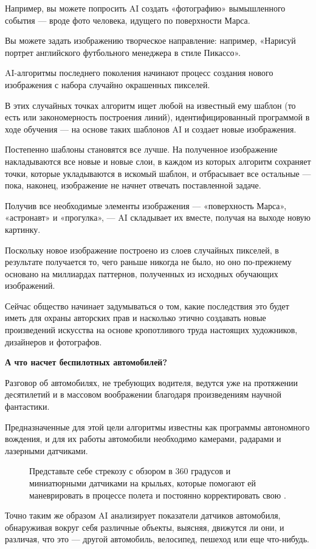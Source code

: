 Например, вы можете попросить AI создать «фотографию» вымышленного события — вроде фото человека, идущего по поверхности Марса.

Вы можете задать изображению творческое направление: например, «Нарисуй портрет английского футбольного менеджера в стиле Пикассо».

AI-алгоритмы последнего поколения начинают процесс создания нового изображения с набора случайно окрашенных пикселей.

В этих случайных точках алгоритм ищет любой  на известный ему шаблон (то есть  или закономерность построения линий), идентифицированный программой в ходе обучения --- на основе таких шаблонов AI и создает новые изображения.

Постепенно шаблоны становятся все лучше. На полученное изображение накладываются все новые и новые слои, в каждом из которых алгоритм сохраняет точки, которые укладываются в искомый шаблон, и отбрасывает все остальные — пока, наконец, изображение не начнет отвечать поставленной задаче.

Получив все необходимые элементы изображения — «поверхность Марса», «астронавт» и «прогулка», — AI складывает их вместе, получая на выходе новую картинку.

Поскольку новое изображение построено из слоев случайных пикселей, в результате получается то, чего раньше никогда не было, но оно по-прежнему основано на миллиардах паттернов, полученных из исходных обучающих изображений.

Сейчас общество начинает задумываться о том, какие последствия это будет иметь для охраны авторских прав и насколько этично создавать новые произведений искусства на основе кропотливого труда настоящих художников, дизайнеров и фотографов.


\textbf{А что насчет беспилотных автомобилей?}

Разговор об автомобилях, не требующих водителя, ведутся уже на протяжении десятилетий и   в массовом воображении благодаря произведениям научной фантастики.

Предназначенные для этой цели алгоритмы известны как программы автономного вождения, и для их работы автомобили необходимо  камерами, радарами и лазерными датчиками.

\begin{figure}
    \begin{fancyquotes}
        Представьте себе стрекозу с обзором в 360 градусов и миниатюрными датчиками на крыльях, которые помогают ей маневрировать в процессе полета и постоянно корректировать свою .
    \end{fancyquotes}
\end{figure}
Точно таким же образом AI анализирует показатели датчиков автомобиля, обнаруживая вокруг себя различные объекты, выясняя, движутся ли они, и различая, что это — другой автомобиль, велосипед, пешеход или еще что-нибудь.

